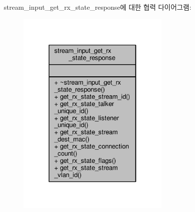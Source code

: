 stream\+\_\+input\+\_\+get\+\_\+rx\+\_\+state\+\_\+response에 대한 협력 다이어그램\+:
\nopagebreak
\begin{figure}[H]
\begin{center}
\leavevmode
\includegraphics[width=214pt]{classavdecc__lib_1_1stream__input__get__rx__state__response__coll__graph}
\end{center}
\end{figure}
